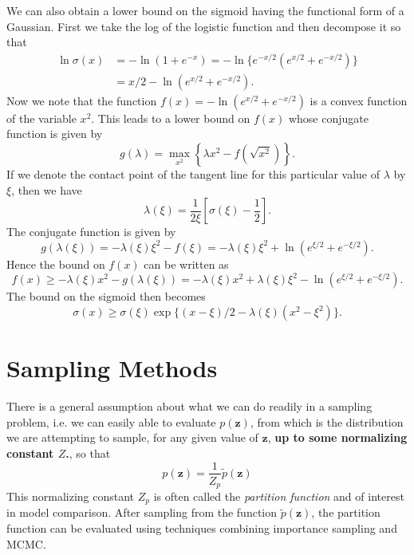 \documentclass[a4paper]{report}
\renewcommand{\bf}{\mathbf}
\newcommand{\imp}[1]{{\color{blue}\textit{#1}}}
\begin{document}
We can also obtain a lower bound on the sigmoid having the functional form of a Gaussian. First we take the log of the logistic function and then decompose it so that
\begin{align}
	\ln \sigma(x) &= -\ln(1 + e^{-x}) = -\ln \{ e^{-x/2}(e^{x/2}+e^{-x/2}) \}\\
	&= x/2 - \ln(e^{x/2}+e^{-x/2}).
\end{align}
Now we note that the function $f(x) = -\ln (e^{x/2}+e^{-x/2})$ is a convex function of the variable $x^2$. This leads to a lower bound on $f(x)$ whose conjugate function is given by
\begin{equation}
	g(\lambda) = \max_{x^2} \left\{ \lambda x^2 - f\left( \sqrt{x^2} \right) \right\}.
\end{equation}
If we denote the contact point of the tangent line for this particular value of $\lambda$ by $\xi$, then we have
\begin{equation}
	\lambda (\xi) = \frac{1}{2\xi} \left[ \sigma(\xi) - \frac{1}{2} \right].
\end{equation}
The conjugate function is given by
\begin{equation}
	g(\lambda(\xi)) = -\lambda(\xi) \xi^2 - f(\xi) = -\lambda(\xi) \xi^2 + \ln (e^{\xi /2}+e^{-\xi/2}).
\end{equation}
Hence the bound on $f(x)$ can be written as
\begin{equation}
	f(x) \geq -\lambda (\xi) x^2 - g(\lambda(\xi)) = -\lambda(\xi)x^2 + \lambda(\xi) \xi^2 - \ln(e^{\xi/2}+e^{-\xi/2}).
\end{equation}
The bound on the sigmoid then becomes
\begin{equation}
	\sigma(x) \geq \sigma(\xi) \exp \{ (x-\xi)/2-\lambda(\xi)(x^2-\xi^2) \}.
\end{equation}
\section{Sampling Methods}
There is a general assumption about what we can do readily in a sampling problem, i.e. we can easily able to evaluate $p(\bf{z})$, from which is the distribution we are attempting to sample, for any given value of $\bf{z}$, \textbf{up to some normalizing constant $Z$.}, so that
\begin{equation}
	p(\bf{z}) = \frac{1}{Z_p} \tilde{p}(\bf{z})
\end{equation}
This normalizing constant $Z_p$ is often called the \imp{partition function} and of interest in model comparison. After sampling from the function $\tilde{p}(\bf{z})$, the partition function can be evaluated using techniques combining importance sampling and MCMC. 
\end{document}
